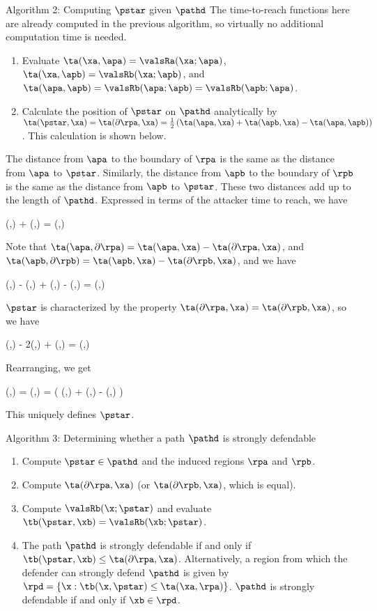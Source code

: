 Algorithm 2: Computing $\pstar$ given $\pathd$
The time-to-reach functions here are already computed in the previous algorithm, so virtually no additional computation time is needed.
 
\begin{enumerate}
\item Evaluate $\ta(\xa,\apa) = \valsRa(\xa;\apa)$, $\ta(\xa,\apb) = \valsRb(\xa;\apb)$, and $\ta(\apa,\apb) = \valsRb(\apa;\apb) = \valsRb(\apb;\apa)$.
\item Calculate the position of $\pstar$ on $\pathd$ analytically by $\ta(\pstar,\xa) = \ta(\partial\rpa,\xa) = \frac{1}{2} \left( \ta(\apa,\xa)  + \ta(\apb,\xa) - \ta(\apa,\apb) \right)$. This calculation is shown below.
\end{enumerate}

The distance from $\apa$ to the boundary of $\rpa$ is the same as the distance from $\apa$ to $\pstar$. Similarly, the distance from $\apb$ to the boundary of $\rpb$ is the same as the distance from $\apb$ to $\pstar$. These two distances add up to the length of $\pathd$. Expressed in terms of the attacker time to reach, we have

\bq
\ta(\apa,\partial\rpa) + \ta(\apb,\partial\rpb) = \ta(\apa,\apb)
\eq

Note that $\ta(\apa,\partial\rpa) =  \ta(\apa,\xa) - \ta(\partial\rpa,\xa)$, and $\ta(\apb,\partial\rpb) =  \ta(\apb,\xa) - \ta(\partial\rpb,\xa)$, and we have

\bq
\ta(\apa,\xa) - \ta(\partial\rpa,\xa) + \ta(\apb,\xa) - \ta(\partial\rpb,\xa) = \ta(\apa,\apb)
\eq

$\pstar$ is characterized by the property $\ta(\partial\rpa,\xa) = \ta(\partial\rpb,\xa)$, so we have

\bq
\ta(\apa,\xa) - 2\ta(\partial\rpa,\xa) + \ta(\apb,\xa) = \ta(\apa,\apb)
\eq

Rearranging, we get

\bq
\ta(\pstar,\xa) = \ta(\partial\rpa,\xa) =  \left( \ta(\apa,\xa)  + \ta(\apb,\xa) - \ta(\apa,\apb) \right)
\eq

This uniquely defines $\pstar$.

Algorithm 3: Determining whether a path $\pathd$ is strongly defendable
\begin{enumerate}
\item Compute $\pstar\in\pathd$ and the induced regions $\rpa$ and $\rpb$.
\item Compute $\ta(\partial\rpa,\xa)$ (or $\ta(\partial\rpb,\xa)$, which is equal).
\item Compute $\valsRb(\x;\pstar)$ and evaluate $\tb(\pstar,\xb) = \valsRb(\xb;\pstar)$.
\item The path $\pathd$ is strongly defendable if and only if $\tb(\pstar,\xb) \le \ta(\partial\rpa,\xa)$.
Alternatively, a region from which the defender can strongly defend $\pathd$ is given by $\rpd = \left\{\x: \tb(\x,\pstar) \le \ta(\xa,\rpa)\right\}$. $\pathd$ is strongly defendable if and only if $\xb\in\rpd$.
\end{enumerate}

